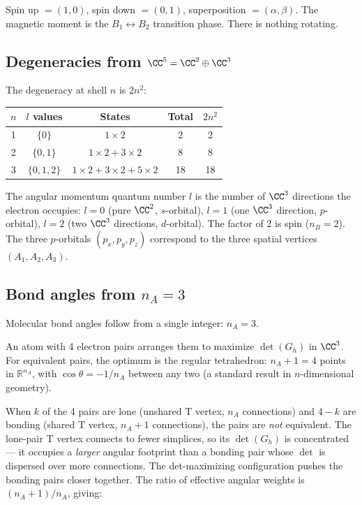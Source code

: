 Spin up $= (1, 0)$, spin down $= (0, 1)$, superposition $= (\alpha, \beta)$. The magnetic moment is the $B_1 \leftrightarrow B_2$ transition phase. There is nothing rotating.

\subsection{Degeneracies from $\CC^5 = \CC^2 \oplus \CC^3$}

The degeneracy at shell $n$ is $2n^2$:
\begin{center}
\begin{tabular}{ccccc}
\hline
$n$ & $l$ values & States & Total & $2n^2$ \\
\hline
1 & $\{0\}$ & $1 \times 2$ & 2 & 2 \\
2 & $\{0, 1\}$ & $1 \times 2 + 3 \times 2$ & 8 & 8 \\
3 & $\{0, 1, 2\}$ & $1 \times 2 + 3 \times 2 + 5 \times 2$ & 18 & 18 \\
\hline
\end{tabular}
\end{center}

The angular momentum quantum number $l$ is the number of $\CC^3$ directions the electron occupies: $l = 0$ (pure $\CC^2$, $s$-orbital), $l = 1$ (one $\CC^3$ direction, $p$-orbital), $l = 2$ (two $\CC^3$ directions, $d$-orbital). The factor of 2 is spin ($n_B = 2$). The three $p$-orbitals $(p_x, p_y, p_z)$ correspond to the three spatial vertices $(A_1, A_2, A_3)$.

\subsection{Bond angles from $n_A = 3$}

Molecular bond angles follow from a single integer: $n_A = 3$.

An atom with 4 electron pairs arranges them to maximize $\det(G_h)$ in $\CC^3$. For equivalent pairs, the optimum is the regular tetrahedron: $n_A + 1 = 4$ points in $\mathbb{R}^{n_A}$, with $\cos\theta = -1/n_A$ between any two (a standard result in $n$-dimensional geometry).

When $k$ of the 4 pairs are lone (unshared T vertex, $n_A$ connections) and $4-k$ are bonding (shared T vertex, $n_A + 1$ connections), the pairs are \emph{not} equivalent. The lone-pair T vertex connects to fewer simplices, so its $\det(G_h)$ is concentrated --- it occupies a \emph{larger} angular footprint than a bonding pair whose $\det$ is dispersed over more connections. The det-maximizing configuration pushes the bonding pairs closer together. The ratio of effective angular weights is $(n_A + 1)/n_A$, giving:

